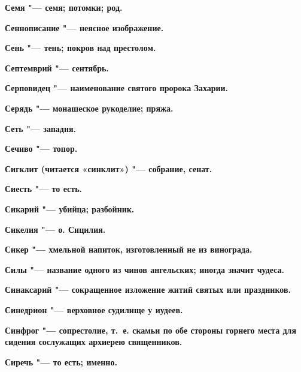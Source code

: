 \begin{mymulticols}{2}
\bfseries Семя\normalfont{} "--- семя; потомки; род. 




\bfseries Сеннописание\normalfont{} "--- неясное изображение. 




\bfseries Сень\normalfont{} "--- тень; покров над престолом. 




\bfseries Септемврий\normalfont{} "--- сентябрь. 




\bfseries Серповидец\normalfont{} "--- наименование святого пророка Захарии. 




\bfseries Серядь\normalfont{} "--- монашеское рукоделие; пряжа. 




\bfseries Сеть\normalfont{} "--- западня. 




\bfseries Сечиво\normalfont{} "--- топор. 




\bfseries Сигклит\normalfont{} (читается «синклит») "--- собрание, сенат. 




\bfseries Сиесть\normalfont{} "--- то есть. 




\bfseries Сикарий\normalfont{} "--- убийца; разбойник. 




\bfseries Сикелия\normalfont{} "--- о. Сицилия. 




\bfseries Сикер\normalfont{} "--- хмельной напиток, изготовленный не из винограда. 




\bfseries Силы\normalfont{} "--- название одного из чинов ангельских; иногда значит чудеса. 




\bfseries Синаксарий\normalfont{} "--- сокращенное изложение житий святых или праздников. 




\bfseries Синедрион\normalfont{} "--- верховное судилище у иудеев. 




\bfseries Синфрог\normalfont{} "--- сопрестолие, т.~е. скамьи по обе стороны горнего места для сидения сослужащих архиерею священников. 




\bfseries Сиречь\normalfont{} "--- то есть; именно. 





\end{mymulticols}
